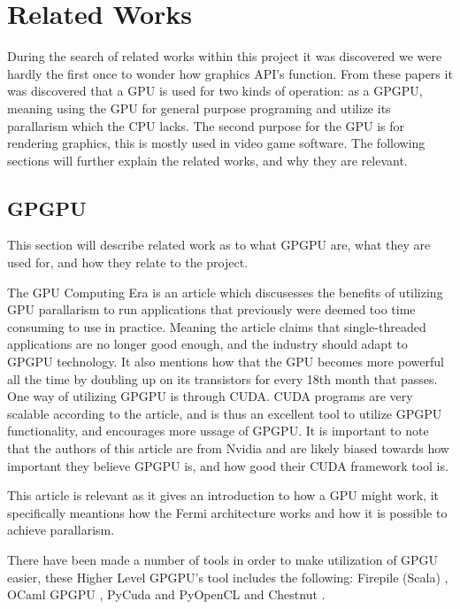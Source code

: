 \section{Related Works}\label{sec:problem_statement}
During the search of related works within this project it was discovered we were hardly the first once to wonder how graphics API's function. From these papers it was discovered that a GPU is used for two kinds of operation: as a GPGPU, meaning using the GPU for general purpose programing and utilize its parallarism which the CPU lacks. 
The second purpose for the GPU is for rendering graphics, this is mostly used in video game software. The following sections will further explain the related works, and why they are relevant.

\subsection{GPGPU}
This section will describe related work as to what GPGPU are, what they are used for, and how they relate to the project.

The GPU Computing Era \cite{gpu_computing_era} is an article which discusesses the benefits of utilizing GPU parallarism to run applications that previously were deemed too time consuming to use in practice. 
Meaning the article claims that single-threaded applications are no longer good enough, and the industry should adapt to GPGPU technology. 
It also mentions how that the GPU becomes more powerful all the time by doubling up on its transistors for every 18th month that passes. 
One way of utilizing GPGPU is through CUDA.
CUDA programs are very scalable according to the article, and is thus an excellent tool to utilize GPGPU functionality, and encourages more ussage of GPGPU. It is important to note that the authors of this article are from Nvidia and are likely biased towards how important they believe GPGPU is, and how good their CUDA framework tool is. 

This article is relevant as it gives an introduction to how a GPU might work, it specifically meantions how the Fermi architecture works and how it is possible to achieve parallarism.

There have been made a number of tools in order to make utilization of GPGU easier, these Higher Level GPGPU's tool includes the following: Firepile (Scala) \cite{2011_firepile}, OCaml GPGPU \cite{bourgoin_2017_high}, PyCuda and PyOpenCL \cite{2012_pycuda_pyopencl} and Chestnut \cite{stromme_2012_chestnut}.

